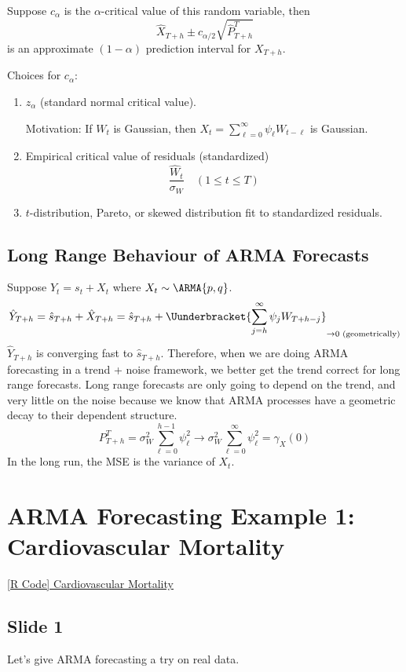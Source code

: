 Suppose $ c_\alpha $ is the $ \alpha $-critical value of this random variable,
then
\[ \hat{X}_{T+h}\pm c_{\alpha/2}\sqrt{\hat{P}_{T+h}^T} \]
is an approximate $ (1-\alpha) $ prediction interval for $ X_{T+h} $.

Choices for $ c_\alpha $:
\begin{enumerate}[(1)]
    \item $ z_\alpha $ (standard normal critical value).

          Motivation: If $ W_t $ is Gaussian, then $ X_t=\sum_{\ell=0}^{\infty} \psi_\ell W_{t-\ell} $
          is Gaussian.
    \item Empirical critical value of residuals (standardized)
          \[ \frac{\hat{W}_{t}}{\sigma_W}\quad(1\le t\le T)  \]
    \item $ t $-distribution, Pareto, or skewed distribution fit to standardized residuals.
\end{enumerate}

\subsection*{Long Range Behaviour of ARMA Forecasts}
Suppose $ Y_t=s_t+X_t $ where $ X_t \sim \ARMA{p,q} $.
\[ \hat{Y}_{T+h}=\hat{s}_{T+h}+\hat{X}_{T+h}=\hat{s}_{T+h}+\Uunderbracket{\sum_{j=h}^{\infty} \psi_j W_{T+h-j}}_{\to 0\text{ (geometrically)}} \]
$ \hat{Y}_{T+h} $ is converging fast to $ \hat{s}_{T+h} $. {\color{blue}Therefore, when we are doing ARMA
        forecasting in a trend + noise framework, we better get the trend correct for long range
        forecasts. Long range forecasts are only going to depend on the trend, and very
        little on the noise because we know that ARMA processes have a geometric decay to
        their dependent structure.}
\[ P_{T+h}^T=\sigma_W^2 \sum_{\ell=0}^{h-1} \psi_\ell^2\to \sigma_W^2 \sum_{\ell=0}^{\infty} \psi_\ell^2=\gamma_X(0) \]
In the long run, the MSE is the variance of $ X_t $.

\section{ARMA Forecasting Example 1: Cardiovascular Mortality}
\href{https://github.com/Hextical/university-notes/blob/master/year-3/semester-2/STAT%20443/code/4.5%20-%20Cardiovascular%20Mortality%20Forecasting.R}{[R Code] Cardiovascular Mortality}
\subsection*{Slide 1}
Let's give ARMA forecasting a try on real data.

